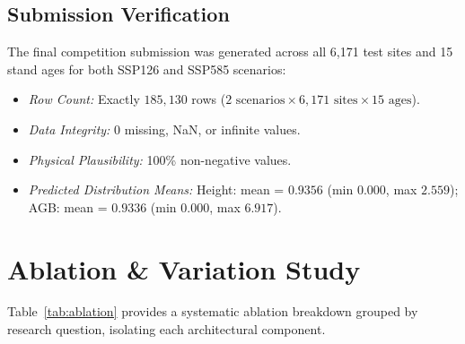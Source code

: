 \documentclass[conference]{IEEEtran}
\begin{document}
\subsection{Submission Verification}
The final competition submission was generated across all 6,171 test sites and 15 stand ages for both SSP126 and SSP585 scenarios:
\begin{itemize}
    \item \textit{Row Count:} Exactly $185,130$ rows ($2 \text{ scenarios} \times 6,171 \text{ sites} \times 15 \text{ ages}$).
    \item \textit{Data Integrity:} 0 missing, NaN, or infinite values.
    \item \textit{Physical Plausibility:} 100\% non-negative values.
    \item \textit{Predicted Distribution Means:} Height: mean = $0.9356$ (min $0.000$, max $2.559$); AGB: mean = $0.9336$ (min $0.000$, max $6.917$).
\end{itemize}

\section{Ablation \& Variation Study}

Table~\ref{tab:ablation} provides a systematic ablation breakdown grouped by research question, isolating each architectural component.
\end{document}
